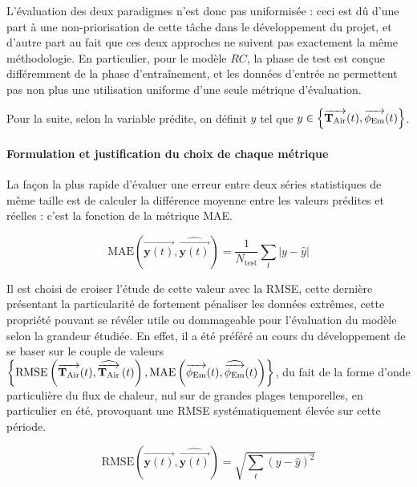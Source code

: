            \begin{bluebox}

                L'évaluation des deux paradigmes n'est donc pas uniformisée : ceci est dû d'une part à une non-priorisation de cette tâche dans le développement du projet, et d'autre part au fait que ces deux approches ne suivent pas exactement
                la même méthodologie.
                En particulier, pour le modèle $RC$, la phase de test est conçue différemment de la phase d'entraînement, et les données d'entrée ne permettent pas non plus une utilisation uniforme d'une seule métrique d'évaluation.

                Pour la suite, selon la variable prédite, on définit $y$ tel que $y \in \left\{\operatorname{\overrightarrow{\mathbf{T}_{\text{Air}}}}(t),\operatorname{\overrightarrow{\mathbf{\phi}_{\text{Em}}}}(t)\right\}$.
            \end{bluebox}

            \paragraph{Formulation et justification du choix de chaque métrique}

            La façon la plus rapide d'évaluer une erreur entre deux séries statistiques de même taille est de calculer la différence moyenne entre les valeurs prédites et réelles : c'est la fonction de la métrique MAE\@.

            \begin{equation}
                \mathrm{MAE}\left(\overrightarrow {\mathbf y(t)}, \widehat{\overrightarrow{\mathbf y(t)}}\right) = \frac{1}{N_{\text{test}}}\sum_t\left|y-\hat y\right|\label{eq:mae}
            \end{equation}

            Il est choisi de croiser l'étude de cette valeur avec la RMSE, cette dernière présentant la particularité de fortement pénaliser les données extrêmes, cette propriété pouvant se révéler utile ou dommageable pour l'évaluation du modèle
            selon la grandeur étudiée.
            En effet, il a été préféré au cours du développement de se baser sur le couple de valeurs $\left\{ \mathrm{RMSE}\left(\operatorname{\overrightarrow{\mathbf{T}_{\text{Air}}}}(t), \operatorname{\widehat{\overrightarrow{\mathbf{T}_{\text{Air}}}}}\left(t\right)\right), \mathrm{MAE}\left(\operatorname{\overrightarrow{\mathbf{\phi}_{\text{Em}}}}(t), \operatorname{\widehat{\overrightarrow{\phi_{\text{Em}}}}}(t)\right)\right\}$, du fait de la forme d'onde particulière du flux de chaleur, nul sur de grandes plages temporelles, en particulier en été, provoquant une RMSE systématiquement élevée sur cette période.

            \begin{equation}
                \mathrm{RMSE}\left(\overrightarrow {\mathbf y(t)}, \widehat{\overrightarrow{\mathbf y(t)}}\right) = \sqrt{\sum_t \left(y -\hat y\right)^2}\label{eq:RMSE}
            \end{equation}

